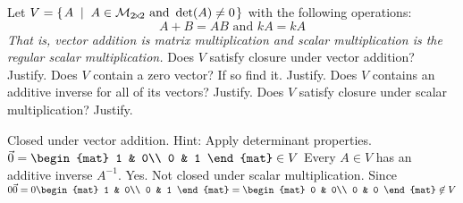 
\begin{Exercise}[
name={},
title={}, 
difficulty=0,
origin={\cite{YL}}]
Let $V=\mbox{$\left\{\hspace{0.1em}A \;\;\middle|\;\; A \in\mathcal{M}_{2 \! \times \! 2} \text{ and } \operatorname{det}(A)\neq 0 \hspace{0.1em}\right\}$}$
with the following operations:
\[
A+B=AB \text{ and } kA=kA
\]
\textit{That is, vector addition is matrix multiplication and scalar multiplication is the regular scalar multiplication.}
\Question Does $V$ satisfy closure under vector addition? Justify.
\Question Does $V$ contain a zero vector? If so find it.  Justify.
\Question Does $V$ contains an additive inverse for all of its vectors? Justify.
\Question Does $V$ satisfy closure under scalar multiplication? Justify.

\end{Exercise}

\begin{Answer}
\Question Closed under vector addition.  Hint: Apply determinant properties.
\Question 
$\vec{0}
=\begin{mat}
1 & 0\\
0 & 1
\end{mat}\in V$
\Question Every $A\in V$ has an additive inverse $A^{-1}$.
\Question Yes.
\Question Not closed under scalar multiplication. Since 
$0\vec{0}=
0\begin{mat}
1 & 0\\
0 & 1
\end{mat}=
\begin{mat}
0 & 0\\
0 & 0
\end{mat}\not\in V$
\end{Answer}
